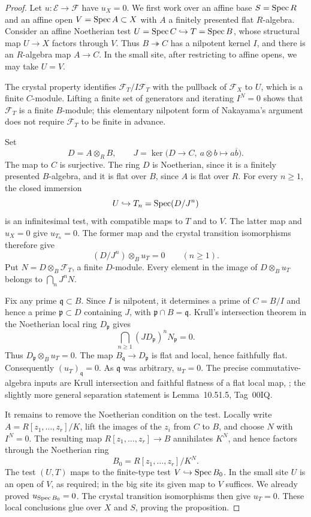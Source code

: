 \begin{proof}
Let $u:\mathcal E\to\mathcal F$ have $u_X=0$.  We first work over an affine base $S=\operatorname{Spec} R$ and an affine open $V=\operatorname{Spec} A\subset X$ with $A$ a finitely presented flat $R$-algebra.  Consider an affine Noetherian test $U=\operatorname{Spec} C\hookrightarrow T=\operatorname{Spec} B$, whose structural map $U\to X$ factors through $V$.  Thus $B\twoheadrightarrow C$ has a nilpotent kernel $I$, and there is an $R$-algebra map $A\to C$.  In the small site, after restricting to affine opens, we may take $U=V$.

The crystal property identifies $\mathcal F_T/I\mathcal F_T$ with the pullback of $\mathcal F_X$ to $U$, which is a finite $C$-module.  Lifting a finite set of generators and iterating $I^N=0$ shows that $\mathcal F_T$ is a finite $B$-module; this elementary nilpotent form of Nakayama's argument does not require $\mathcal F_T$ to be finite in advance.

Set
\[
 D=A\otimes_R B,\qquad
 J=\ker\bigl(D\longrightarrow C,\ a\otimes b\longmapsto a\overline b\bigr).
\]
The map to $C$ is surjective.  The ring $D$ is Noetherian, since it is a finitely presented $B$-algebra, and it is flat over $B$, since $A$ is flat over $R$.  For every $n\geq1$, the closed immersion
\[
 U\hookrightarrow T_n=\operatorname{Spec}(D/J^n)
\]
is an infinitesimal test, with compatible maps to $T$ and to $V$.  The latter map and $u_X=0$ give $u_{T_n}=0$.  The former map and the crystal transition isomorphisms therefore give
\[
 (D/J^n)\otimes_B u_T=0\qquad(n\geq1).
\]
Put $N=D\otimes_B\mathcal F_T$, a finite $D$-module.  Every element in the image of $D\otimes_B u_T$ belongs to $\bigcap_nJ^nN$.

Fix any prime $\mathfrak q\subset B$.  Since $I$ is nilpotent, it determines a prime of $C=B/I$ and hence a prime $\mathfrak p\subset D$ containing $J$, with $\mathfrak p\cap B=\mathfrak q$.  Krull's intersection theorem in the Noetherian local ring $D_{\mathfrak p}$ gives
\[
 \bigcap_{n\geq1}(JD_{\mathfrak p})^nN_{\mathfrak p}=0.
\]
Thus $D_{\mathfrak p}\otimes_Bu_T=0$.  The map $B_{\mathfrak q}\to D_{\mathfrak p}$ is flat and local, hence faithfully flat.  Consequently $(u_T)_{\mathfrak q}=0$.  As $\mathfrak q$ was arbitrary, $u_T=0$.  The precise commutative-algebra inputs are Krull intersection and faithful flatness of a flat local map, \citet[Lemmas~10.51.4 and~10.39.17, Tags~00IP and~00HR]{StacksProject}; the slightly more general separation statement is Lemma~10.51.5, Tag~00IQ.

It remains to remove the Noetherian condition on the test.  Locally write $A=R[z_1,\ldots,z_r]/K$, lift the images of the $z_i$ from $C$ to $B$, and choose $N$ with $I^N=0$.  The resulting map $R[z_1,\ldots,z_r]\to B$ annihilates $K^N$, and hence factors through the Noetherian ring
\[
 B_0=R[z_1,\ldots,z_r]/K^N.
\]
The test $(U,T)$ maps to the finite-type test
$V\hookrightarrow\operatorname{Spec} B_0$.  In the small site $U$ is an open of $V$, as required; in the big site its given map to $V$ suffices.  We already proved $u_{\operatorname{Spec} B_0}=0$.  The crystal transition isomorphisms then give $u_T=0$.  These local conclusions glue over $X$ and $S$, proving the proposition.
\end{proof}

